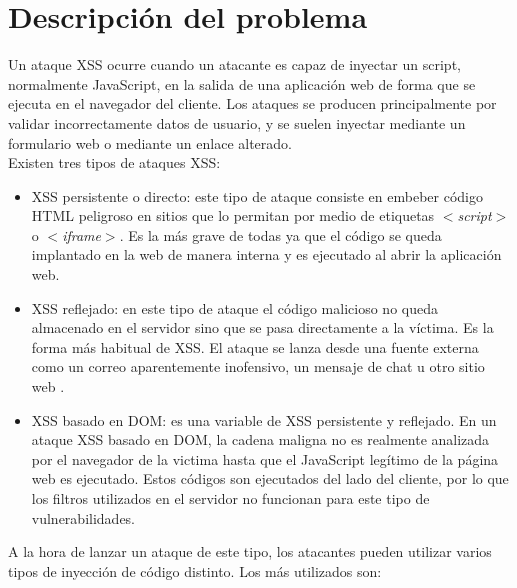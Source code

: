 \section{Descripci\'on del problema}

Un ataque XSS ocurre cuando un atacante es capaz de inyectar un script, normalmente JavaScript, en la salida de una aplicación
web de forma que se ejecuta en el navegador del cliente. Los ataques se producen principalmente por validar incorrectamente datos
de usuario, y se suelen inyectar mediante un formulario web o mediante un enlace alterado.\\

Existen tres tipos de ataques XSS: \\

\begin{itemize}
	\item XSS persistente o directo: este tipo de ataque consiste en embeber código HTML peligroso en sitios que lo permitan por
medio de etiquetas \textit{$<$script$>$ } o \textit{$<$iframe$>$}. Es la más grave de todas ya que el código se queda implantado en la web de
manera interna y es ejecutado al abrir la aplicación web.\\

	\item XSS reflejado: en este tipo de ataque el código malicioso no queda almacenado en el servidor sino que se pasa
directamente a la víctima. Es la forma más habitual de XSS. El ataque se lanza desde una fuente externa como un correo
aparentemente inofensivo, un mensaje de chat u otro sitio web \cite{siete}.\\

	\item XSS basado en DOM: es una variable de XSS persistente y reflejado. En un ataque XSS basado en DOM, la cadena maligna no es realmente analizada por el navegador de la victima hasta que el JavaScript legítimo de la página web es ejecutado. Estos códigos son ejecutados del lado
del cliente, por lo que los filtros utilizados en el servidor no funcionan para este tipo de vulnerabilidades.\\
\end{itemize}

A la hora de lanzar un ataque de este tipo, los atacantes pueden utilizar varios tipos de inyección de código distinto. Los más utilizados son:\\

